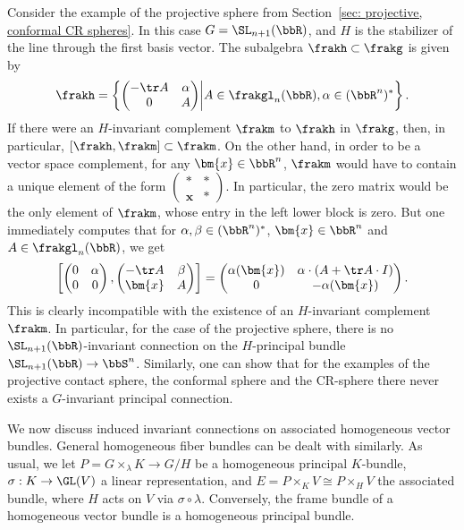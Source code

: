 \begin{example}\label{ex 1.4.6(2) Cap}
    Consider the example of the projective sphere from Section~\ref{sec: projective, conformal CR spheres}. In this case $G=\SL_{n+1}(\bbR)$, and $H$ is the stabilizer of the line through the first basis vector. The subalgebra $\frakh\subset \frakg$ is given by 
    \[\frakh=\left\{\begin{pmatrix}-\tr A& \alpha\\ 0&A\end{pmatrix}\middle| A\in\frakgl_n(\bbR),\alpha\in(\bbR^n)^\ast\right\}.\]
    If there were an $H$-invariant complement $\frakm$ to $\frakh$ in $\frakg$, then, in particular, $[\frakh,\frakm]\subset\frakm$. On the other hand, in order to be a vector space complement, for any $\bm{x}\in\bbR^n$, $\frakm$ would have to contain a unique element of the form $\left(\begin{smallmatrix}
        \ast &\ast\\\bm{x}&\ast
    \end{smallmatrix}\right)$. In particular, the zero matrix would be the only element of $\frakm$, whose entry in the left lower block is zero. But one immediately computes that for $\alpha,\beta\in(\bbR^n)^\ast$, $\bm{x}\in\bbR^n$ and $A\in\frakgl_n(\bbR)$, we get 
    \[\left[\begin{pmatrix}
        0&\alpha\\0&0
    \end{pmatrix},
    \begin{pmatrix}
        -\tr A&\beta\\
        \bm{x}&A
    \end{pmatrix}
    \right]
    =
    \begin{pmatrix}
        \alpha(\bm{x})& \alpha\cdot (A+\tr A\cdot I)\\
        0& -\alpha(\bm{x})
    \end{pmatrix}.
    \]
    This is clearly incompatible with the existence of an $H$-invariant complement $\frakm$. In particular, for the case of the projective sphere, there is no $\SL_{n+1}(\bbR)$-invariant connection on the $H$-principal bundle $\SL_{n+1}(\bbR)\to \bbS^n$. Similarly, one can show that for the examples of the projective contact sphere, the conformal sphere and the CR-sphere there never exists a $G$-invariant principal connection.
\end{example}






We now discuss induced invariant connections on associated homogeneous vector bundles. General homogeneous fiber bundles can be dealt with similarly. As usual, we let $P=G\times_\lambda K\to G\slash H$ be a homogeneous principal $K$-bundle, $\sigma:K\to \GL(V)$ a linear representation, and $E=P\times_K V\cong P\times_H V$ the associated bundle, where $H$ acts on $V$ via $\sigma\circ\lambda$. Conversely, the frame bundle of a homogeneous vector bundle is a homogeneous principal bundle. 

